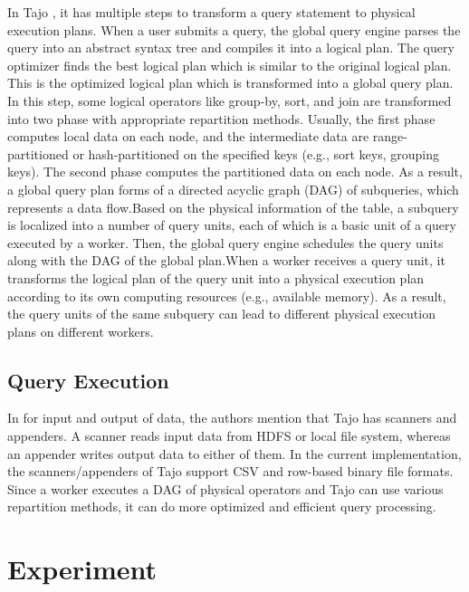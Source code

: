 \documentclass[9pt,twocolumn,twoside]{styles/osajnl}
\begin{document}
\noindent
In Tajo \cite{tajo-paper} \cite{www-apache-tajo}, it has multiple
steps to transform a query statement to physical execution plans. When
a user submits a query, the global query engine parses the query into
an abstract syntax tree and compiles it into a logical plan. The query
optimizer finds the best logical plan which is similar to the original
logical plan. This is the optimized logical plan which is transformed
into a global query plan. In this step, some logical operators like
group-by, sort, and join are transformed into two phase with
appropriate repartition methods. Usually, the first phase computes
local data on each node, and the intermediate data are
range-partitioned or hash-partitioned on the specified keys (e.g.,
sort keys, grouping keys). The second phase computes the partitioned
data on each node. As a result, a global query plan forms of a
directed acyclic graph (DAG) of subqueries, which represents a data
flow.Based on the physical information of the table, a subquery is
localized into a number of query units, each of which is a basic unit
of a query executed by a worker. Then, the global query engine
schedules the query units along with the DAG of the global
plan.\newline \newline When a worker receives a query unit, it
transforms the logical plan of the query unit into a physical
execution plan according to its own computing resources (e.g.,
available memory). As a result, the query units of the same subquery
can lead to different physical execution plans on different workers.

\subsection{Query Execution}
In \cite{tajo-paper} for input and output of data, the authors mention
that Tajo has scanners and appenders. A scanner reads input data from
HDFS or local file system, whereas an appender writes output data to
either of them. In the current implementation, the scanners/appenders
of Tajo support CSV and row-based binary file formats. Since a worker
executes a DAG of physical operators and Tajo can use various
repartition methods, it can do more optimized and efficient query
processing.

\section{Experiment}
\end{document}

